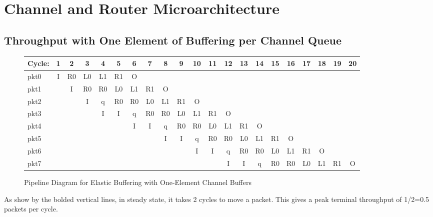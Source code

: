 \documentclass[10pt]{article}
\begin{document}
\cleardoublepage
\section{Channel and Router Microarchitecture}

\subsection{Throughput with One Element of Buffering per Channel Queue}

\begin{figure}[H]
\centering
{\setlength{\tabcolsep}{2pt}
\begin{tabular}{|l|c|c|c|c|c|c|c|c|c!{\vrule width 1.5pt}c|c!{\vrule width 1.5pt}c|c!{\vrule width 1.5pt}c|c!{\vrule width 1.5pt}c|c!{\vrule width 1.5pt}c|c!{\vrule width 1.5pt}c|}
\hline
Cycle: & 1  & 2  & 3  & 4  & 5  & 6  & 7  & 8  & 9  & 10 & 11 & 12 & 13 & 14 & 15 & 16 & 17 & 18 & 19 & 20 \\ \hline
pkt0   & I  & R0 & L0 & L1 & R1 & O  &    &    &    &    &    &    &    &    &    &    &    &    &    &    \\ \hline
pkt1   &    & I  & R0 & R0 & L0 & L1 & R1 & O  &    &    &    &    &    &    &    &    &    &    &    &    \\ \hline
pkt2   &    &    & I  & q  & R0 & R0 & L0 & L1 & R1 & O  &    &    &    &    &    &    &    &    &    &    \\ \hline
pkt3   &    &    &    & I  & I  & q  & R0 & R0 & L0 & L1 & R1 & O  &    &    &    &    &    &    &    &    \\ \hline
pkt4   &    &    &    &    &    & I  & I  & q  & R0 & R0 & L0 & L1 & R1 & O  &    &    &    &    &    &    \\ \hline
pkt5   &    &    &    &    &    &    &    & I  & I  & q  & R0 & R0 & L0 & L1 & R1 & O  &    &    &    &    \\ \hline
pkt6   &    &    &    &    &    &    &    &    &    & I  & I  & q  & R0 & R0 & L0 & L1 & R1 & O  &    &    \\ \hline
pkt7   &    &    &    &    &    &    &    &    &    &    &    & I  & I  & q  & R0 & R0 & L0 & L1 & R1 & O  \\ \hline
\end{tabular}
}
\caption{Pipeline Diagram for Elastic Buffering with One-Element Channel Buffers}
\end{figure}
As show by the bolded vertical lines, in steady state, it takes 2 cycles to move a packet. This gives a peak terminal throughput of 1/2=0.5 packets per cycle.
\end{document}
